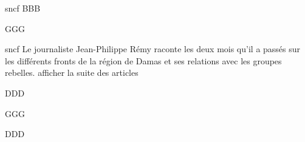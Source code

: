 \documentclass[12pt]{book}
\begin{document}
\begin{pages}
\begin{Leftside}
\beginnumbering
\pstart
sncf
\pend
\ledheads
{}
\eledheads
BBB
\pend

\pstart
{}

GGG
\pend
\endnumbering
\end{Leftside}

\begin{Rightside}
\beginnumbering
\pstart
sncf Le journaliste Jean-Philippe Rémy raconte les deux mois qu'il a passés sur les différents fronts de la région de Damas et ses relations avec les groupes rebelles.
afficher la suite des articles

\pend
\ledheads
{}
\eledheads
DDD
\pend
\pstart
{}

GGG
\pend
\endnumbering
\end{Rightside}
\Pages
\end{pages}

\beginnumbering
\ledheads
{}
\eledheads
DDD
\pend

\endnumbering
\end{document}

